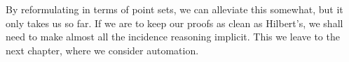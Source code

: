 By reformulating in terms of point sets, we can alleviate this somewhat, but it only takes us so far. If we are to keep our proofs as clean as Hilbert's, we shall need to make almost all the incidence reasoning implicit. This we leave to the next chapter, where we consider automation.

